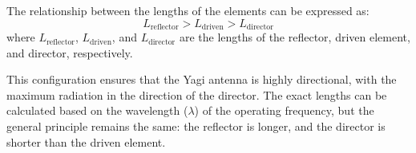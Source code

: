 The relationship between the lengths of the elements can be expressed as:
\[
L_{\text{reflector}} > L_{\text{driven}} > L_{\text{director}}
\]
where \( L_{\text{reflector}} \), \( L_{\text{driven}} \), and \( L_{\text{director}} \) are the lengths of the reflector, driven element, and director, respectively.

This configuration ensures that the Yagi antenna is highly directional, with the maximum radiation in the direction of the director. The exact lengths can be calculated based on the wavelength (\(\lambda\)) of the operating frequency, but the general principle remains the same: the reflector is longer, and the director is shorter than the driven element.

